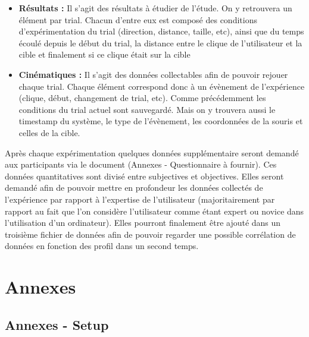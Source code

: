 \documentclass[a4paper, 12pt]{article}
\begin{document}
\begin{itemize}
    \item \textbf{Résultats :} Il s'agit des résultats à étudier de l'étude. On y retrouvera un élément par trial. Chacun d'entre eux est composé des conditions d'expérimentation du trial (direction, distance, taille, etc), ainsi que du temps écoulé depuis le début du trial, la distance entre le clique de l'utilisateur et la cible et finalement si ce clique était sur la cible
    \item \textbf{Cinématiques :} Il s'agit des données collectables afin de pouvoir rejouer chaque trial. Chaque élément correspond donc à un évènement de l'expérience (clique, début, changement de trial, etc). Comme précédemment les conditions du trial actuel sont sauvegardé. Mais on y trouvera aussi le timestamp du système, le type de l'évènement, les coordonnées de la souris et celles de la cible.
\end{itemize}

Après chaque expérimentation quelques données supplémentaire seront demandé aux participants via le document (Annexes - Questionnaire à fournir). Ces données quantitatives sont divisé entre subjectives et objectives. Elles seront demandé afin de pouvoir mettre en profondeur les données collectés de l'expérience par rapport à l'expertise de l'utilisateur (majoritairement par rapport au fait que l'on considère l'utilisateur comme étant expert ou novice dans l'utilisation d'un ordinateur). Elles pourront finalement être ajouté dans un troisième fichier de données afin de pouvoir regarder une possible corrélation de données en fonction des profil dans un second temps.

\pagebreak
{}
\section*{Annexes}

\subsection*{Annexes - Setup}
\end{document}
